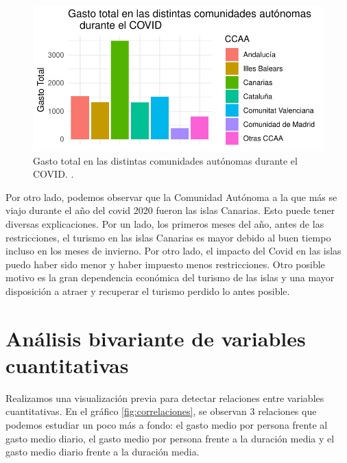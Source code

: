 \documentclass[data,article,submit,moreauthors,pdftex]{Definitions/mdpi}
\begin{document}
\begin{figure}[H]
\includegraphics{ProyectoAED2024_Rmd_files/figure-latex/gasto comunidades covid-1} \caption{Gasto total en las distintas comunidades autónomas durante el COVID. .\label{fig:gastototalporCCAAcovid}}\label{fig:gasto comunidades covid}
\end{figure}

Por otro lado, podemos observar que la Comunidad Autónoma a la que más
se viajo durante el año del covid 2020 fueron las islas Canarias. Esto
puede tener diversas explicaciones. Por un lado, los primeros meses del
año, antes de las restricciones, el turismo en las islas Canarias es
mayor debido al buen tiempo incluso en los meses de invierno. Por otro
lado, el impacto del Covid en las islas puedo haber sido menor y haber
impuesto menos restricciones. Otro posible motivo es la gran dependencia
económica del turismo de las islas y una mayor disposición a atraer y
recuperar el turismo perdido lo antes posible.

\hypertarget{anuxe1lisis-bivariante-de-variables-cuantitativas}{%
\section{Análisis bivariante de variables
cuantitativas}\label{anuxe1lisis-bivariante-de-variables-cuantitativas}}

Realizamos una visualización previa para detectar relaciones entre
variables cuantitativas. En el gráfico \ref{fig:correlaciones}, se
observan 3 relaciones que podemos estudiar un poco más a fondo: el gasto
medio por persona frente al gasto medio diario, el gasto medio por
persona frente a la duración media y el gasto medio diario frente a la
duración media.
\end{document}
